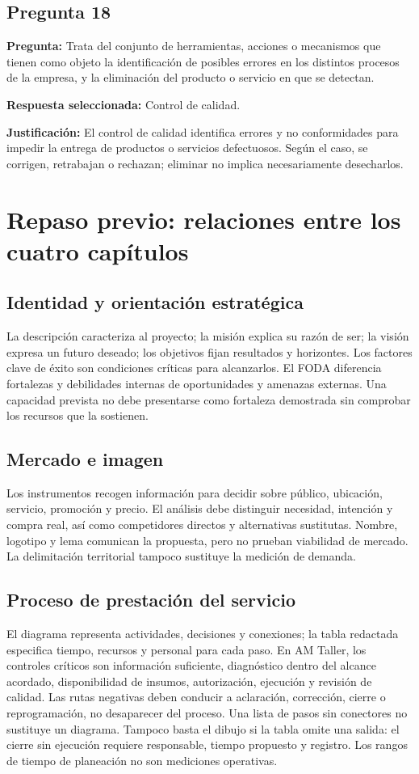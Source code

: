 {\subsection{Pregunta 18}
\textbf{Pregunta:} Trata del conjunto de herramientas, acciones o mecanismos que tienen como objeto la identificación de posibles errores en los distintos procesos de la empresa, y la eliminación del producto o servicio en que se detectan.
\par\textbf{Respuesta seleccionada:} Control de calidad.
\par\textbf{Justificación:} El control de calidad identifica errores y no conformidades para impedir la entrega de productos o servicios defectuosos. Según el caso, se corrigen, retrabajan o rechazan; eliminar no implica necesariamente desecharlos.
\section{Repaso previo: relaciones entre los cuatro capítulos}
\subsection{Identidad y orientación estratégica}
La descripción caracteriza al proyecto; la misión explica su razón de ser; la visión expresa un futuro deseado; los objetivos fijan resultados y horizontes. Los factores clave de éxito son condiciones críticas para alcanzarlos. El FODA diferencia fortalezas y debilidades internas de oportunidades y amenazas externas. Una capacidad prevista no debe presentarse como fortaleza demostrada sin comprobar los recursos que la sostienen.
\subsection{Mercado e imagen}
Los instrumentos recogen información para decidir sobre público, ubicación, servicio, promoción y precio. El análisis debe distinguir necesidad, intención y compra real, así como competidores directos y alternativas sustitutas. Nombre, logotipo y lema comunican la propuesta, pero no prueban viabilidad de mercado. La delimitación territorial tampoco sustituye la medición de demanda.
\subsection{Proceso de prestación del servicio}
El diagrama representa actividades, decisiones y conexiones; la tabla redactada especifica tiempo, recursos y personal para cada paso. En AM Taller, los controles críticos son información suficiente, diagnóstico dentro del alcance acordado, disponibilidad de insumos, autorización, ejecución y revisión de calidad. Las rutas negativas deben conducir a aclaración, corrección, cierre o reprogramación, no desaparecer del proceso.
Una lista de pasos sin conectores no sustituye un diagrama. Tampoco basta el dibujo si la tabla omite una salida: el cierre sin ejecución requiere responsable, tiempo propuesto y registro. Los rangos de tiempo de planeación no son mediciones operativas.
}
